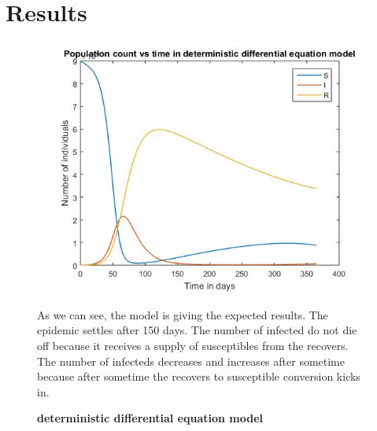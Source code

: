 \documentclass[prl,12pt,citeautoscript,reprint]{revtex4-1}
\begin{document}
\section{Results}
\begin{figure}[H]
\begin{center}
\includegraphics[scale=0.33]{n1}
\begin{minipage}{0.45\textwidth} 
{\footnotesize As we can see, the model is giving the expected results. The epidemic settles after 150 days. The number of infected do not die off because it receives a supply of susceptibles from the recovers. The number of infecteds decreases and increases after sometime because after sometime the recovers to susceptible conversion kicks in.

\par}
\end{minipage}
 \caption{\textbf{deterministic differential equation model}}
  \label{fig:bn}
\end{center}
\end{figure}
\end{document}
